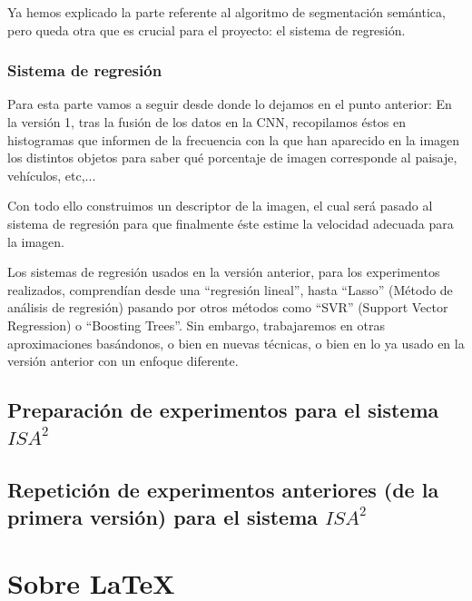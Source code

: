 \documentclass[12pt,oneside,a4paper]{article}
\begin{document}
Ya hemos explicado la parte referente al algoritmo de segmentación semántica, pero queda otra que es crucial para el proyecto: el sistema de regresión.
\subsubsection{Sistema de regresión}

Para esta parte vamos a seguir desde donde lo dejamos en el punto anterior: En la versión 1, tras la fusión de los datos en la CNN, recopilamos éstos en histogramas que informen de la frecuencia con la que han aparecido en la imagen los distintos objetos para saber qué porcentaje de imagen corresponde al paisaje, vehículos, etc,... 

Con todo ello construimos un descriptor de la imagen, el cual será pasado al sistema de regresión para que finalmente éste estime la velocidad adecuada para la imagen.

Los sistemas de regresión usados en la versión anterior, para los experimentos realizados, comprendían desde una ``regresión lineal'', hasta ``Lasso'' (Método de análisis de regresión) pasando por otros métodos como ``SVR'' (Support Vector Regression) o ``Boosting Trees''. Sin embargo, trabajaremos en otras aproximaciones basándonos, o bien en nuevas técnicas, o bien en lo ya usado en la versión anterior con un enfoque diferente. 
\subsection{Preparación de experimentos para el sistema $ISA^2$}

\subsection{Repetición de experimentos anteriores (de la primera versión) para el sistema $ISA^2$}


\section{Sobre \LaTeX}
\end{document}
